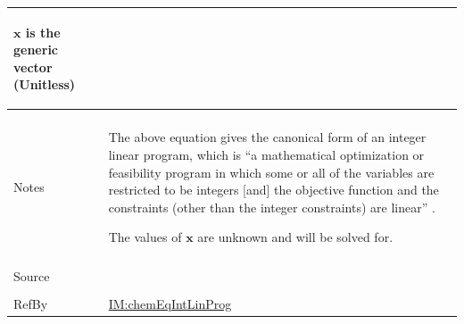\documentclass[12pt]{article}
\begin{document}
\begin{minipage}{\textwidth}
\begin{tabular}{>{\raggedright}p{}>{\raggedright\arraybackslash}p{}}
              \begin{symbDescription}
              \item{$\symbf{x}$ is the generic vector (Unitless)}
              \end{symbDescription}
\\ \midrule \\
Notes & The above equation gives the canonical form of an integer linear program, which is ``a mathematical optimization or feasibility program in which some or all of the variables are restricted to be integers [and] the objective function and the constraints (other than the integer constraints) are linear'' \cite{ilpWiki}.
        
        The values of $\symbf{x}$ are unknown and will be solved for.
        
\\ \midrule \\
Source & \cite{ilpWiki}
         
\\ \midrule \\
RefBy & \hyperref[IM:chemEqIntLinProg]{IM:chemEqIntLinProg}
        
\\ \bottomrule
\end{tabular}
\end{minipage}
\vspace{\baselineskip}
\noindent
\end{document}
